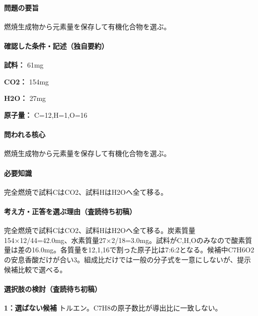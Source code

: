 \paragraph{問題の要旨} 燃焼生成物から元素量を保存して有機化合物を選ぶ。

\paragraph{確認した条件・記述（独自要約）}\mbox{}\par

\noindent\textbf{試料：} 61mg\par

\noindent\textbf{CO2：} 154mg\par

\noindent\textbf{H2O：} 27mg\par

\noindent\textbf{原子量：} C=\allowbreak{}12,H=\allowbreak{}1,O=\allowbreak{}16\par

\paragraph{問われる核心} 燃焼生成物から元素量を保存して有機化合物を選ぶ。

\paragraph{必要知識} 完全燃焼で試料CはCO2、試料HはH2Oへ全て移る。

\paragraph{考え方・正答を選ぶ理由（査読待ち初稿）} 完全燃焼で試料CはCO2、試料HはH2Oへ全て移る。炭素質量154×12/44=\allowbreak{}42.0mg、水素質量27×2/18=\allowbreak{}3.0mg。試料がC,H,Oのみなので酸素質量は差の16.0mg。各質量を12,1,16で割った原子比は7:6:2となる。候補中C7H6O2の安息香酸だけが合い3。組成比だけでは一般の分子式を一意にしないが、提示候補比較で選べる。

\paragraph{選択肢の検討（査読待ち初稿）}\mbox{}\par

\noindent\textbf{1：選ばない候補} トルエン。C7H8の原子数比が導出比に一致しない。\par

